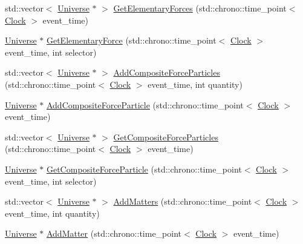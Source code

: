 \begin{DoxyCompactItemize}
\item 
std\+::vector$<$ \mbox{\hyperlink{classUniverse}{Universe}} $\ast$ $>$ \mbox{\hyperlink{classUniverse_a6a8ed579b2eedd3aceebda9f3d78aa0e}{Get\+Elementary\+Forces}} (std\+::chrono\+::time\+\_\+point$<$ \mbox{\hyperlink{universe_8h_a0ef8d951d1ca5ab3cfaf7ab4c7a6fd80}{Clock}} $>$ event\+\_\+time)
\item 
\mbox{\hyperlink{classUniverse}{Universe}} $\ast$ \mbox{\hyperlink{classUniverse_a9506017d944cb64e67567477c1505a53}{Get\+Elementary\+Force}} (std\+::chrono\+::time\+\_\+point$<$ \mbox{\hyperlink{universe_8h_a0ef8d951d1ca5ab3cfaf7ab4c7a6fd80}{Clock}} $>$ event\+\_\+time, int selector)
\item 
std\+::vector$<$ \mbox{\hyperlink{classUniverse}{Universe}} $\ast$ $>$ \mbox{\hyperlink{classUniverse_a23d74e377203fca7cb74e0ffee7244b6}{Add\+Composite\+Force\+Particles}} (std\+::chrono\+::time\+\_\+point$<$ \mbox{\hyperlink{universe_8h_a0ef8d951d1ca5ab3cfaf7ab4c7a6fd80}{Clock}} $>$ event\+\_\+time, int quantity)
\item 
\mbox{\hyperlink{classUniverse}{Universe}} $\ast$ \mbox{\hyperlink{classUniverse_ab2671c2218c98f0f1f487c5b3bb96e3c}{Add\+Composite\+Force\+Particle}} (std\+::chrono\+::time\+\_\+point$<$ \mbox{\hyperlink{universe_8h_a0ef8d951d1ca5ab3cfaf7ab4c7a6fd80}{Clock}} $>$ event\+\_\+time)
\item 
std\+::vector$<$ \mbox{\hyperlink{classUniverse}{Universe}} $\ast$ $>$ \mbox{\hyperlink{classUniverse_aed37d7224b4e31bdfb0632e39bf19694}{Get\+Composite\+Force\+Particles}} (std\+::chrono\+::time\+\_\+point$<$ \mbox{\hyperlink{universe_8h_a0ef8d951d1ca5ab3cfaf7ab4c7a6fd80}{Clock}} $>$ event\+\_\+time)
\item 
\mbox{\hyperlink{classUniverse}{Universe}} $\ast$ \mbox{\hyperlink{classUniverse_a3e2acc1d75765a6e8e852fca919c5b96}{Get\+Composite\+Force\+Particle}} (std\+::chrono\+::time\+\_\+point$<$ \mbox{\hyperlink{universe_8h_a0ef8d951d1ca5ab3cfaf7ab4c7a6fd80}{Clock}} $>$ event\+\_\+time, int selector)
\item 
std\+::vector$<$ \mbox{\hyperlink{classUniverse}{Universe}} $\ast$ $>$ \mbox{\hyperlink{classUniverse_ae00d10b2a23c9cedf1ff89e9da875563}{Add\+Matters}} (std\+::chrono\+::time\+\_\+point$<$ \mbox{\hyperlink{universe_8h_a0ef8d951d1ca5ab3cfaf7ab4c7a6fd80}{Clock}} $>$ event\+\_\+time, int quantity)
\item 
\mbox{\hyperlink{classUniverse}{Universe}} $\ast$ \mbox{\hyperlink{classUniverse_a090d9ad1b88d81364e872e17d65edca4}{Add\+Matter}} (std\+::chrono\+::time\+\_\+point$<$ \mbox{\hyperlink{universe_8h_a0ef8d951d1ca5ab3cfaf7ab4c7a6fd80}{Clock}} $>$ event\+\_\+time)

\end{DoxyCompactItemize}
